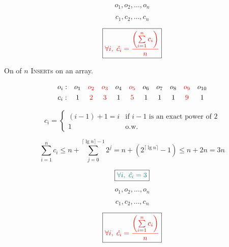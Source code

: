 
\begin{frame}{}
  \centerline{}

  \[
    o_1, o_2, \ldots, o_n
  \]

  \[
    c_1, c_2, \ldots, c_n
  \]

  \pause
  \[
    \boxed{\textcolor{red}{\forall i,\; \hat{c_i} = \frac{\left(\sum\limits_{i = 1}^{n} c_i\right)}{n}}}
  \]
\end{frame}

\begin{frame}{}
  \centerline{}

  \pause
  \vspace{0.30cm}
  \centerline{On  of $n$ \textsc{Insert}s on an  array.}

  \pause
  \vspace{0.30cm}
  \[
    \begin{array}{ccccccccccc}
      o_i:  & o_1 & \textcolor{red}{o_2} & \textcolor{red}{o_3} & o_4 & \textcolor{red}{o_5} & o_6 & o_7 & o_8 & \textcolor{red}{o_9} & o_{10} \\[3pt]
      c_i:  & 1 & \textcolor{red}{2} & \textcolor{red}{3} & 1 & \textcolor{red}{5} & 1 & 1 & 1 & \textcolor{red}{9} & 1  \\
    \end{array}
  \]

  \pause
  \vspace{0.30cm}
  \begin{displaymath}
    c_i = \left\{ \begin{array}{ll}
      (i-1)+1 = i & \textrm{if $i - 1$ is an exact power of 2}\\
      1 & \textrm{o.w.}
    \end{array} \right.
  \end{displaymath}

  \pause
  \vspace{0.30cm}
  \[
    \sum_{i=1}^{n} c_i \le n + \sum_{j=0}^{\lceil \lg n \rceil - 1} 2^{j} = n +
    (2^{\lceil \lg n \rceil} - 1) \le n + 2n = 3n
  \]

  \pause
  \[
    \boxed{\textcolor{teal}{\forall i,\; \hat{c_i} = 3}}
  \]
\end{frame}
\begin{frame}{}
  \centerline{}

  \[
    o_1, o_2, \ldots, o_n
  \]

  \[
    c_1, c_2, \ldots, c_n
  \]

  \pause
  \[
    \boxed{\textcolor{red}{\forall i,\; \hat{c_i} = \frac{\left(\sum\limits_{i = 1}^{n} c_i\right)}{n}}}
  \]
\end{frame}

